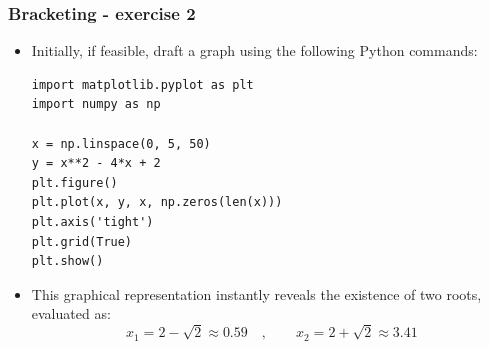 \begin{frame}[fragile]
  \frametitle{Bracketing - exercise 2}

  \begin{itemize}
    \item Initially, if feasible, draft a graph using the following Python commands:
          \begin{lstlisting}
import matplotlib.pyplot as plt
import numpy as np

x = np.linspace(0, 5, 50)
y = x**2 - 4*x + 2
plt.figure()
plt.plot(x, y, x, np.zeros(len(x)))
plt.axis('tight')
plt.grid(True)
plt.show()
        \end{lstlisting}
    \item This graphical representation instantly reveals the existence of two roots, evaluated as:
          \[
            x_1 = 2 - \sqrt{2} \approx 0.59 \quad ,\qquad
            x_2 = 2 + \sqrt{2} \approx 3.41
          \]
  \end{itemize}
\end{frame}




